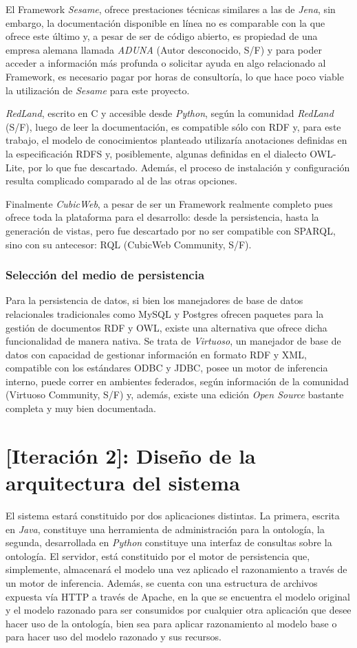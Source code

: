 El Framework \textit{Sesame}, ofrece prestaciones técnicas similares a las de \textit{Jena}, sin embargo, la documentación disponible en línea no es comparable con la que ofrece este último y, a pesar de ser de código abierto, es propiedad de una empresa alemana llamada \textit{ADUNA} (Autor desconocido, S/F) y para poder acceder a información más profunda o solicitar ayuda en algo relacionado al Framework, es necesario pagar por horas de consultoría, lo que hace poco viable la utilización de \textit{Sesame} para este proyecto.

\textit{RedLand}, escrito en C y accesible desde \textit{Python}, según la comunidad \textit{RedLand} (S/F), luego de leer la documentación, es compatible sólo con RDF y, para este trabajo, el modelo de conocimientos planteado utilizaría anotaciones definidas en la especificación RDFS y, posiblemente, algunas definidas en el dialecto OWL-Lite, por lo que fue descartado. Además, el proceso de instalación y configuración resulta complicado comparado al de las otras opciones.

Finalmente \textit{CubicWeb}, a pesar de ser un Framework realmente completo pues ofrece toda la plataforma para el desarrollo: desde la persistencia, hasta la generación de vistas, pero fue descartado por no ser compatible con SPARQL, sino con su antecesor: RQL (CubicWeb Community, S/F).

\subsubsection{Selección del medio de persistencia}
Para la persistencia de datos, si bien los manejadores de base de datos relacionales tradicionales como MySQL y Postgres ofrecen paquetes para la gestión de documentos RDF y OWL, existe una alternativa que ofrece dicha funcionalidad de manera nativa. Se trata de \textit{Virtuoso}, un manejador de base de datos con capacidad de gestionar información en formato RDF y XML, compatible con los estándares ODBC y JDBC, posee un motor de inferencia interno, puede correr en ambientes federados, según información de la comunidad (Virtuoso Community, S/F) y, además, existe una edición \textit{Open Source} bastante completa y muy bien documentada.

\section{[Iteración 2]: Diseño de la arquitectura del sistema}
El sistema estará constituido por dos aplicaciones distintas. La primera, escrita en \textit{Java}, constituye una herramienta de administración para la ontología, la segunda, desarrollada en \textit{Python} constituye una interfaz de consultas sobre la ontología. El servidor, está constituido por el motor de persistencia que, simplemente, almacenará el modelo una vez aplicado el razonamiento a través de un motor de inferencia. Además, se cuenta con una estructura de archivos expuesta vía HTTP a través de Apache, en la que se encuentra el modelo original y el modelo razonado para ser consumidos por cualquier otra aplicación que desee hacer uso de la ontología, bien sea para aplicar razonamiento al modelo base o para hacer uso del modelo razonado y sus recursos.

